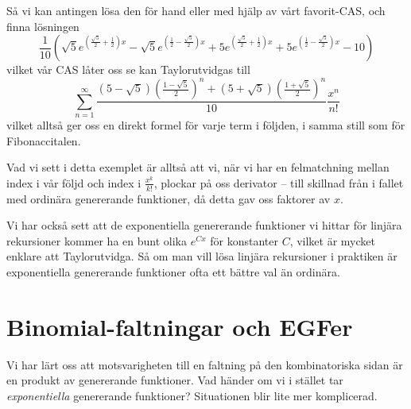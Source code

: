 \documentclass[nobib]{tufte-handout}
\begin{document}
\begin{example}
  Så vi kan antingen lösa den för hand eller med hjälp av vårt favorit-CAS, och finna lösningen
  $$\frac{1}{10} \left(\sqrt{5} e^{\left(\frac{\sqrt{5}}{2}+\frac{1}{2}\right) x}-\sqrt{5} e^{\left(\frac{1}{2}-\frac{\sqrt{5}}{2}\right) x}+5 e^{\left(\frac{\sqrt{5}}{2}+\frac{1}{2}\right) x}+5 e^{\left(\frac{1}{2}-\frac{\sqrt{5}}{2}\right) x}-10\right)$$
  vilket vår CAS låter oss se kan Taylorutvidgas till
  $$\sum_{n=1}^{\infty} \frac{\left(5 - \sqrt{5}\right) \left(\frac{1 - \sqrt{5}}{2}\right)^n + \left(5 + \sqrt{5}\right) \left(\frac{1 + \sqrt{5}}{2}\right)^n}{10} \frac{x^n}{n!}$$
  vilket alltså ger oss en direkt formel för varje term i följden, i samma still som för Fibonaccitalen.
\end{example}

Vad vi sett i detta exemplet är alltså att vi, när vi har en felmatchning mellan index i vår följd och index i $\frac{x^k}{k!}$, plockar på oss derivator -- till skillnad från i fallet med ordinära genererande funktioner, då detta gav oss faktorer av $x$.

Vi har också sett att de exponentiella genererande funktioner vi hittar för linjära rekursioner kommer ha en bunt olika $e^{Cx}$ för konstanter $C$, vilket är mycket enklare att Taylorutvidga. Så om man vill lösa linjära rekursioner i praktiken är exponentiella genererande funktioner ofta ett bättre val än ordinära. 
\section{Binomial-faltningar och EGFer}

Vi har lärt oss att motsvarigheten till en faltning på den kombinatoriska sidan är en produkt av genererande funktioner. Vad händer om vi i stället tar \emph{exponentiella} genererande funktioner? Situationen blir lite mer komplicerad.
\end{document}
